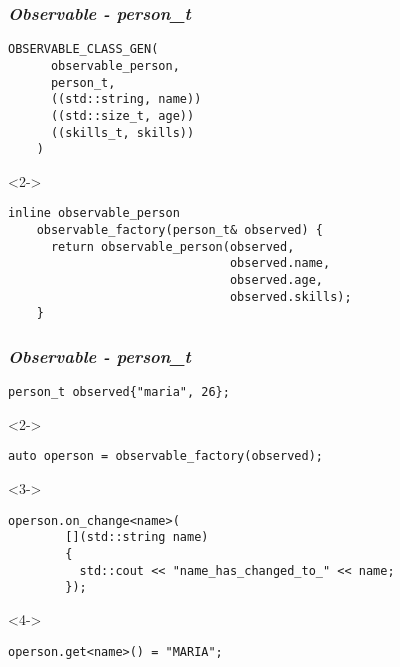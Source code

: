 \documentclass[t]{beamer}
\begin{document}
\begin{frame}[fragile]
  \frametitle{\textit{Observable - person\_t}}
  \begin{lstlisting}[basicstyle=\small]
    OBSERVABLE_CLASS_GEN(
      observable_person,
      person_t,
      ((std::string, name))
      ((std::size_t, age))
      ((skills_t, skills))
    )
  \end{lstlisting}

  \begin{onlyenv}<2->
  \begin{lstlisting}[basicstyle=\small]
    inline observable_person 
    observable_factory(person_t& observed) {
      return observable_person(observed, 
                               observed.name, 
                               observed.age,
                               observed.skills);
    }
  \end{lstlisting}
  \end{onlyenv}
\end{frame}

\begin{frame}[fragile]
  \frametitle{\textit{Observable - person\_t}}
  \begin{lstlisting}[basicstyle=\small,escapeinside=`']
    person_t observed{"maria", 26};
  \end{lstlisting}

  \begin{onlyenv}<2->
  \begin{lstlisting}[basicstyle=\small]
    auto operson = observable_factory(observed);
  \end{lstlisting}
  \end{onlyenv}

  \begin{onlyenv}<3->
  \begin{lstlisting}[basicstyle=\small]
    operson.on_change<name>(
        [](std::string name)
        {
          std::cout << "name_has_changed_to_" << name;
        });
  \end{lstlisting}
  \end{onlyenv}

  \begin{onlyenv}<4->
  \begin{lstlisting}[basicstyle=\small]
    operson.get<name>() = "MARIA";
  \end{lstlisting}
  \end{onlyenv}
\end{frame}
\end{document}
